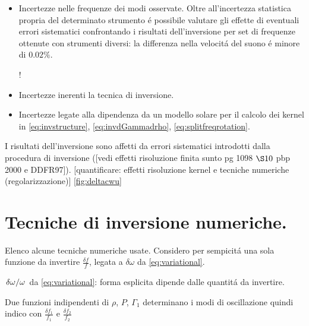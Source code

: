 \documentclass[../main.tex]{subfiles}
\begin{document}
\begin{itemize}

\item Incertezze nelle frequenze dei modi osservate. Oltre all'incertezza statistica propria del determinato strumento \'e possibile valutare gli effette di eventuali errori sistematici confrontando i risultati dell'inversione per set di frequenze ottenute con strumenti diversi: la differenza nella velocit\'a del suono \'e minore di $0.02\%$.

\begin{workout}
!
\end{workout}


\item Incertezze inerenti la tecnica di inversione.

\item Incertezze legate alla dipendenza da un modello solare per il calcolo dei kernel in \eqref{eq:invstructure}, \eqref{eq:invdGammadrho}, \eqref{eq:splitfreqrotation}.

\end{itemize}

\begin{workout}
I risultati dell'inversione sono affetti da errori sistematici introdotti dalla procedura di inversione ([vedi effetti risoluzione finita sunto pg 1098 $\S 10$ pbp 2000 e DDFR97]).
[quantificare: effetti risoluzione kernel e tecniche numeriche (regolarizzazione)]
\ref{fig:deltacwu}
\end{workout}

\section{Tecniche di inversione numeriche.}

Elenco alcune tecniche numeriche usate. Considero per sempicit\'a una sola funzione da invertire $\frac{\delta f}{f}$, legata a $\delta\omega$ da \eqref{eq:variational}.

\begin{workout}

$\left.{\delta\omega}\middle/{\omega}\right.$ da \eqref{eq:variational}: forma esplicita dipende dalle quantit\'a da invertire.

Due funzioni indipendenti di $\rho$, $P$, $\Gamma_1$ determinano i modi di oscillazione quindi indico con $\frac{\delta f_1}{f_1}$ e $\frac{\delta f_2}{f_2}$

\end{workout}
\end{document}
